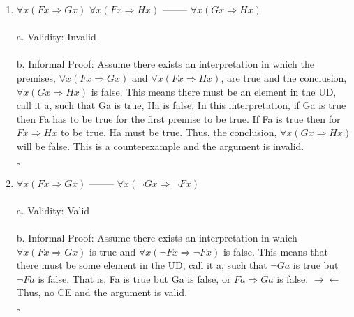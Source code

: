 \documentclass[]{article}
\begin{document}
\begin{enumerate}
    \item $\forall x(Fx\Rightarrow Gx)$
    \newline $\forall x(Fx\Rightarrow Hx)$
    \newline --------
    \newline $\forall x(Gx\Rightarrow Hx)$
    \\\\a.
    \newline Validity: Invalid
    \\\\ b.
    \newline Informal Proof:
    \newline Assume there exists an interpretation in which the premises, $\forall x(Fx\Rightarrow Gx)$ and $\forall x(Fx\Rightarrow Hx)$, are true and the conclusion, $\forall x(Gx\Rightarrow Hx)$ is false. This means there must be an element in the UD, call it a, such that Ga is true, Ha is false. In this interpretation, if Ga is true then Fa has to be true for the first premise to be true. If Fa is true then for $Fx \Rightarrow Hx$ to be true, Ha must be true. Thus, the conclusion, $\forall x (Gx \Rightarrow Hx)$ will be false. This is a counterexample and the argument is invalid.
    \begin{flushright}
    $\square$
    \end{flushright}
    
    \item $\forall x(Fx\Rightarrow Gx)$
    \newline --------
    \newline $\forall x(\neg Gx \Rightarrow \neg Fx)$
    \\\\a.
    \newline Validity: Valid
    \\\\ b.
    \newline Informal Proof:
    \newline Assume there exists an interpretation in which $\forall x(Fx \Rightarrow Gx)$ is true and $\forall x (\neg Fx \Rightarrow \neg Fx)$ is false. This means that there must be some element in the UD, call it a, such that $\neg Ga$ is true but $\neg Fa$ is false. That is, Fa is true but Ga is false, or $Fa \Rightarrow Ga$ is false. $\longrightarrow \longleftarrow$ Thus, no CE and the argument is valid.
    \begin{flushright}
    $\square$
    \end{flushright}
    

\end{enumerate}
\end{document}
